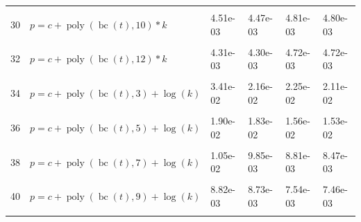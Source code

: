 \documentclass[12pt,a4paper]{article}
\DeclareMathOperator{\bc}{bc}
\DeclareMathOperator{\poly}{poly}
\begin{document}
\begin{longtable}[t]{ll>{\raggedleft\arraybackslash}p{2cm}>{\raggedleft\arraybackslash}p{2cm}>{\raggedleft\arraybackslash}p{2cm}>{\raggedleft\arraybackslash}p{2cm}}
\cellcolor{gray!6}{29} & \cellcolor{gray!6}{$p = c + \poly\left( \bc(t), 9 \right) * k$} & \cellcolor{gray!6}{4.96e-03} & \cellcolor{gray!6}{4.85e-03} & \cellcolor{gray!6}{5.32e-03} & \cellcolor{gray!6}{5.24e-03}\\
30 & $p = c + \poly\left( \bc(t), 10 \right) * k$ & 4.51e-03 & 4.47e-03 & 4.81e-03 & 4.80e-03\\
\cellcolor{gray!6}{31} & \cellcolor{gray!6}{$p = c + \poly\left( \bc(t), 11 \right) * k$} & \cellcolor{gray!6}{4.36e-03} & \cellcolor{gray!6}{4.34e-03} & \cellcolor{gray!6}{4.78e-03} & \cellcolor{gray!6}{4.76e-03}\\
32 & $p = c + \poly\left( \bc(t), 12 \right) * k$ & 4.31e-03 & 4.30e-03 & 4.72e-03 & 4.72e-03\\
\cellcolor{gray!6}{33} & \cellcolor{gray!6}{$p = c + \poly\left( \bc(t), 13 \right) * k$} & \cellcolor{gray!6}{4.29e-03} & \cellcolor{gray!6}{4.29e-03} & \cellcolor{gray!6}{4.72e-03} & \cellcolor{gray!6}{4.72e-03}\\
34 & $p = c + \poly\left( \bc(t), 3 \right) + \log(k)$ & 3.41e-02 & 2.16e-02 & 2.25e-02 & 2.11e-02\\
\cellcolor{gray!6}{35} & \cellcolor{gray!6}{$p = c + \poly\left( \bc(t), 4 \right) + \log(k)$} & \cellcolor{gray!6}{2.17e-02} & \cellcolor{gray!6}{2.06e-02} & \cellcolor{gray!6}{2.14e-02} & \cellcolor{gray!6}{2.07e-02}\\
36 & $p = c + \poly\left( \bc(t), 5 \right) + \log(k)$ & 1.90e-02 & 1.83e-02 & 1.56e-02 & 1.53e-02\\
\cellcolor{gray!6}{37} & \cellcolor{gray!6}{$p = c + \poly\left( \bc(t), 6 \right) + \log(k)$} & \cellcolor{gray!6}{1.07e-02} & \cellcolor{gray!6}{1.01e-02} & \cellcolor{gray!6}{9.66e-03} & \cellcolor{gray!6}{8.99e-03}\\
38 & $p = c + \poly\left( \bc(t), 7 \right) + \log(k)$ & 1.05e-02 & 9.85e-03 & 8.81e-03 & 8.47e-03\\
\cellcolor{gray!6}{39} & \cellcolor{gray!6}{$p = c + \poly\left( \bc(t), 8 \right) + \log(k)$} & \cellcolor{gray!6}{9.48e-03} & \cellcolor{gray!6}{9.13e-03} & \cellcolor{gray!6}{7.66e-03} & \cellcolor{gray!6}{7.62e-03}\\
40 & $p = c + \poly\left( \bc(t), 9 \right) + \log(k)$ & 8.82e-03 & 8.73e-03 & 7.54e-03 & 7.46e-03\\
\cellcolor{gray!6}{41} & \cellcolor{gray!6}{$p = c + \poly\left( \bc(t), 10 \right) + \log(k)$} & \cellcolor{gray!6}{8.55e-03} & \cellcolor{gray!6}{8.50e-03} & \cellcolor{gray!6}{7.16e-03} & \cellcolor{gray!6}{7.13e-03}\\

\end{longtable}
\end{document}
